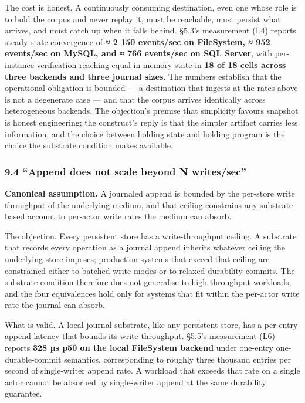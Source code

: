 \documentclass[
]{article}
\begin{document}
The cost is honest. A continuously consuming destination, even one whose
role is to hold the corpus and never replay it, must be reachable, must
persist what arrives, and must catch up when it falls behind. §5.3's
measurement (L4) reports steady-state convergence of \textbf{≈ 2 150
events/sec on FileSystem, ≈ 952 events/sec on MySQL, and ≈ 766
events/sec on SQL Server}, with per-instance verification reaching equal
in-memory state in \textbf{18 of 18 cells across three backends and
three journal sizes}. The numbers establish that the operational
obligation is bounded --- a destination that ingests at the rates above
is not a degenerate case --- and that the corpus arrives identically
across heterogeneous backends. The objection's premise that simplicity
favours snapshot is honest engineering; the construct's reply is that
the simpler artifact carries less information, and the choice between
holding state and holding program is the choice the substrate condition
makes available.

\subsubsection{9.4 ``Append does not scale beyond N
writes/sec''}\label{append-does-not-scale-beyond-n-writessec}

\textbf{Canonical assumption.} A journaled append is bounded by the
per-store write throughput of the underlying medium, and that ceiling
constrains any substrate-based account to per-actor write rates the
medium can absorb.

The objection. Every persistent store has a write-throughput ceiling. A
substrate that records every operation as a journal append inherits
whatever ceiling the underlying store imposes; production systems that
exceed that ceiling are constrained either to batched-write modes or to
relaxed-durability commits. The substrate condition therefore does not
generalise to high-throughput workloads, and the four equivalences hold
only for systems that fit within the per-actor write rate the journal
can absorb.

What is valid. A local-journal substrate, like any persistent store, has
a per-entry append latency that bounds its write throughput. §5.5's
measurement (L6) reports \textbf{328 µs p50 on the local FileSystem
backend} under one-entry one-durable-commit semantics, corresponding to
roughly three thousand entries per second of single-writer append rate.
A workload that exceeds that rate on a single actor cannot be absorbed
by single-writer append at the same durability guarantee.
\end{document}
